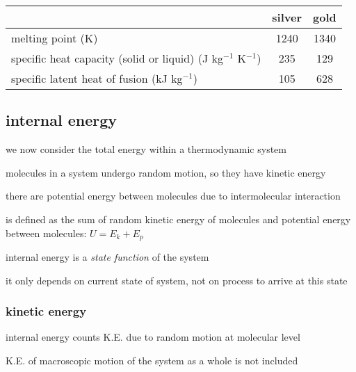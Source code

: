 
\begin{center}
	\begin{tabular}{|l|c|c|}
		\hline  & silver & gold \\ 
		\hline melting point (K) & 1240 & 1340 \\ 
		\hline specific heat capacity (solid or liquid) (J kg$^{-1}$ K$^{-1}$) & 235 & 129 \\ 
		\hline specific latent heat of fusion (kJ kg$^{-1}$) & 105 & 628 \\
		\hline 
	\end{tabular} 
\end{center}



\subsection{internal energy}

we now consider the total energy within a thermodynamic system

molecules in a system undergo random motion, so they have kinetic energy

there are potential energy between molecules due to intermolecular interaction

\begin{ilight}
	 is defined as the sum of random kinetic energy of molecules and potential energy between molecules: $\boxed{U=E_k+E_p}$
\end{ilight}

\cmt internal energy is a \emph{state function} of the system

it only depends on current state of system, not on process to arrive at this state

\subsubsection{kinetic energy}

\cmt internal energy counts K.E. due to random motion at molecular level

K.E. of macroscopic motion of the system as a whole is not included

